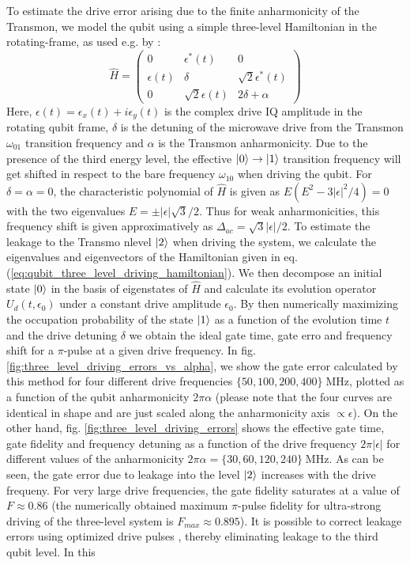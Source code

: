 To estimate the drive error arising due to the finite anharmonicity of the Transmon, we model the qubit using a simple three-level Hamiltonian in the rotating-frame, as used e.g. by \cite{motzoi_simple_2009}:
%
\begin{equation}
\hat{H} = \left(
						 \begin{array}{ccc}
						0 & \epsilon^*(t) & 0 \\
						\epsilon(t) & \delta & \sqrt{2}\epsilon^*(t) \\
						0 & \sqrt{2}\epsilon(t) & 2\delta + \alpha
						\end{array}
					\right) \label{eq:qubit_three_level_driving_hamiltonian}
\end{equation}
%
Here, $\epsilon(t) = \epsilon_x(t)+i\epsilon_y(t)$ is the complex drive IQ amplitude in the rotating qubit frame, $\delta$ is the detuning of the microwave drive from the Transmon $\omega_{01}$ transition frequency and $\alpha$ is the Transmon anharmonicity. Due to the presence of the third energy level, the effective $\left| 0 \right>\to\left| 1 \right>$ transition frequency will get shifted in respect to the bare frequency $\omega_{10}$ when driving the qubit. For $\delta = \alpha = 0$, the characteristic polynomial of $\hat{H}$ is given as $E(E^2-3|\epsilon|^2/4) = 0$ with the two eigenvalues $E=\pm |\epsilon|\sqrt{3}/2$. Thus for weak anharmonicities, this frequency shift is given approximatively as $\Delta_{ac}=\sqrt{3}|\epsilon|/2$. To estimate the leakage to the Transmo nlevel $\left| 2 \right>$ when driving the system, we calculate the eigenvalues and eigenvectors of the Hamiltonian given in eq. (\ref{eq:qubit_three_level_driving_hamiltonian}). We then decompose an initial state $\left| 0 \right>$ in the basis of eigenstates of $\hat{H}$ and calculate its evolution operator $U_d(t,\epsilon_0)$ under a constant drive amplitude $\epsilon_0$. By then numerically maximizing the occupation probability of the state $\left| 1 \right>$ as a function of the evolution time $t$ and the drive detuning $\delta$ we obtain the ideal gate time, gate erro and frequency shift for a $\pi$-pulse at a given drive frequency. In fig. \ref{fig:three_level_driving_errors_vs_alpha}, we show the gate error calculated by this method for four different drive frequencies $\{50,100,200,400\}\;\mathrm{MHz}$, plotted as a function of the qubit anharmonicity $2\pi\alpha$ (please note that the four curves are identical in shape and are just scaled along the anharmonicity axis $\propto \epsilon$). On the other hand, fig. \ref{fig:three_level_driving_errors} shows the effective gate time, gate fidelity and frequency detuning as a function of the drive frequency $2\pi|\epsilon|$ for different values of the anharmonicity $2\pi \alpha = \{30,60,120,240\}\;\mathrm{MHz}$. As can be seen, the gate error due to leakage into the level $\left| 2 \right>$ increases with the drive frequeny. For very large drive frequencies, the gate fidelity saturates at a value of $F\approx 0.86$ (the numerically obtained maximum $\pi$-pulse fidelity for ultra-strong driving of the three-level system is $F_{max}\approx 0.895$). It is possible to correct leakage errors using optimized drive pulses \cite{lucero_reduced_2010,chow_optimized_2010}, thereby eliminating leakage to the third qubit level. In this 